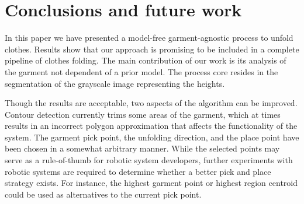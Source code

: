 \chapter{Conclusions and future work}
\label{conclusions_and_future_work}

In this paper we have presented a model-free garment-agnostic process to unfold clothes. Results show that our approach is promising to be included in a complete pipeline of clothes folding. The main contribution of our work is its analysis of the garment not dependent of a prior model. The process core resides in the segmentation of the grayscale image representing the heights.

Though the results are acceptable, two aspects of the algorithm can be improved.
Contour detection currently trims some areas of the garment, which at times results in an incorrect polygon approximation that affects the functionality of the system.
The garment pick point, the unfolding direction, and the place point have been chosen in a somewhat arbitrary manner. While the selected points may serve as a rule-of-thumb for robotic system developers, further experiments with robotic systems are required to determine whether a better pick and place strategy exists. For instance, the highest garment point or highest region centroid could be used as alternatives to the current pick point.




